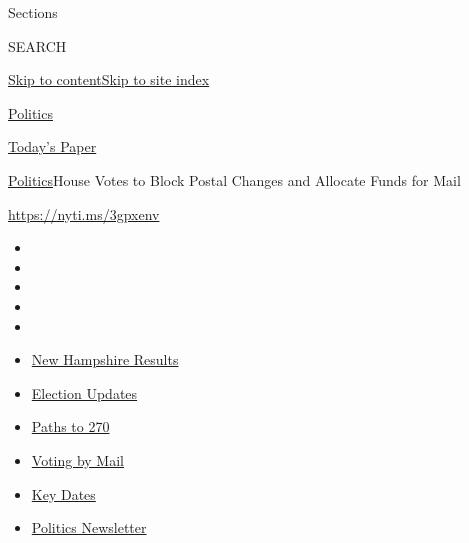Sections

SEARCH

\protect\hyperlink{site-content}{Skip to
content}\protect\hyperlink{site-index}{Skip to site index}

\href{https://www.nytimes3xbfgragh.onion/section/politics}{Politics}

\href{https://myaccount.nytimes3xbfgragh.onion/auth/login?response_type=cookie\&client_id=vi}{}

\href{https://www.nytimes3xbfgragh.onion/section/todayspaper}{Today's
Paper}

\href{/section/politics}{Politics}\textbar{}House Votes to Block Postal
Changes and Allocate Funds for Mail

\url{https://nyti.ms/3gpxenv}

\begin{itemize}
\item
\item
\item
\item
\item
\end{itemize}

\begin{itemize}
\item
  \href{https://www.nytimes3xbfgragh.onion/interactive/2020/09/08/us/elections/results-new-hampshire-primary-elections.html?action=click\&pgtype=Article\&state=default\&region=TOP_BANNER\&context=storylines_menu}{New
  Hampshire Results}
\item
  \href{https://www.nytimes3xbfgragh.onion/live/2020/09/08/us/trump-vs-biden?action=click\&pgtype=Article\&state=default\&region=TOP_BANNER\&context=storylines_menu}{Election
  Updates}
\item
  \href{https://www.nytimes3xbfgragh.onion/interactive/2020/us/elections/election-states-biden-trump.html?action=click\&pgtype=Article\&state=default\&region=TOP_BANNER\&context=storylines_menu}{Paths
  to 270}
\item
  \href{https://www.nytimes3xbfgragh.onion/interactive/2020/08/31/us/politics/vote-by-mail-deadlines.html?action=click\&pgtype=Article\&state=default\&region=TOP_BANNER\&context=storylines_menu}{Voting
  by Mail}
\item
  \href{https://www.nytimes3xbfgragh.onion/interactive/2019/us/elections/2020-presidential-election-calendar.html?action=click\&pgtype=Article\&state=default\&region=TOP_BANNER\&context=storylines_menu}{Key
  Dates}
\item
  \href{https://www.nytimes3xbfgragh.onion/newsletters/politics?action=click\&pgtype=Article\&state=default\&region=TOP_BANNER\&context=storylines_menu}{Politics
  Newsletter}
\end{itemize}


